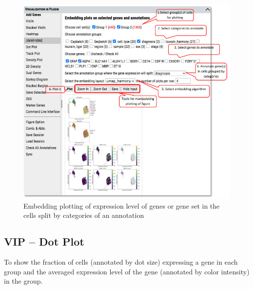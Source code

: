 \documentclass[
]{article}
\begin{document}
\begin{figure}
\centering
\includegraphics{figures/F10.jpg}
\caption{Embedding plotting of expression level of genes or gene set in the cells split by categories of an annotation}
\end{figure}

\hypertarget{vip-dot-plot}{%
\subsection{VIP -- Dot Plot}\label{vip-dot-plot}}

To show the fraction of cells (annotated by dot size) expressing a gene in each group and the averaged expression level of the gene (annotated by color intensity) in the group.
\end{document}
